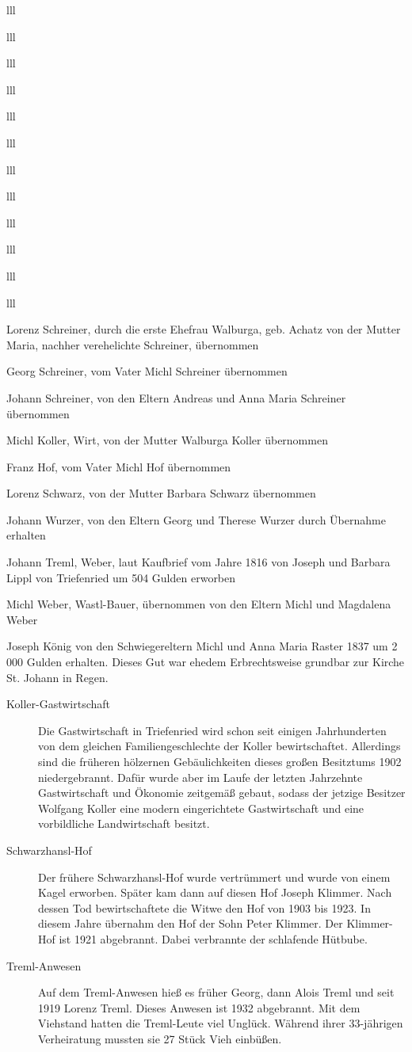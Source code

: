 \documentclass[12pt,a4pager]{book}
\begin{document}
\begin{tabuluar}{lll}
\begin{tabuluar}{lll}
\begin{tabuluar}{lll}
\begin{tabuluar}{lll}
\begin{tabuluar}{lll}
\begin{tabuluar}{lll}
\begin{tabuluar}{lll}
\begin{tabuluar}{lll}
\begin{tabuluar}{lll}
\begin{tabuluar}{lll}
\begin{tabuluar}{lll}
\begin{tabuluar}{lll}
\begin{compactitem}
\item Lorenz Schreiner, durch die erste Ehefrau Walburga, geb. Achatz von der
Mutter Maria, nachher verehelichte Schreiner, übernommen
\item Georg Schreiner, vom Vater Michl Schreiner übernommen
\item Johann Schreiner, von den Eltern Andreas und Anna Maria Schreiner
übernommen
\item Michl Koller, Wirt, von der Mutter Walburga Koller übernommen
\item Franz Hof, vom Vater Michl Hof übernommen
\item Lorenz Schwarz, von der Mutter Barbara Schwarz übernommen
\item Johann Wurzer, von den Eltern Georg und Therese Wurzer durch Übernahme
erhalten
\item Johann Treml, Weber, laut Kaufbrief vom Jahre 1816 von Joseph und Barbara
Lippl von Triefenried um 504 Gulden erworben
\item Michl Weber, Wastl-Bauer, übernommen von den Eltern Michl und Magdalena
Weber
\item Joseph König von den Schwiegereltern Michl und Anna Maria Raster 1837 um 2
000 Gulden erhalten. Dieses Gut war ehedem Erbrechtsweise grundbar zur Kirche
St. Johann in Regen.
\end{compactitem}

\begin{description}
\item[Koller-Gastwirtschaft] Die Gastwirtschaft in Triefenried wird schon seit
einigen Jahrhunderten von dem gleichen Familiengeschlechte der Koller
bewirtschaftet. Allerdings sind die früheren hölzernen Gebäulichkeiten dieses
großen Besitztums 1902 niedergebrannt. Dafür wurde aber im Laufe der letzten
Jahrzehnte Gastwirtschaft und Ökonomie zeitgemäß gebaut, sodass der jetzige
Besitzer Wolfgang Koller eine modern eingerichtete Gastwirtschaft und eine
vorbildliche Landwirtschaft besitzt.

\item[Schwarzhansl-Hof] Der frühere Schwarzhansl-Hof wurde vertrümmert und
wurde von einem Kagel erworben. Später kam dann auf diesen Hof Joseph Klimmer.
Nach dessen Tod bewirtschaftete die Witwe den Hof von 1903 bis 1923. In diesem
Jahre übernahm den Hof der Sohn Peter Klimmer. Der Klimmer-Hof ist 1921
abgebrannt. Dabei verbrannte der schlafende Hütbube.

\item[Treml-Anwesen] Auf dem Treml-Anwesen hieß es früher Georg, dann Alois
Treml und seit 1919 Lorenz Treml. Dieses Anwesen ist 1932 abgebrannt. Mit dem
Viehstand hatten die Treml-Leute viel Unglück. Während ihrer 33-jährigen
Verheiratung mussten sie 27 Stück Vieh einbüßen.


\end{description}
\end{tabuluar}
\end{tabuluar}
\end{tabuluar}
\end{tabuluar}
\end{tabuluar}
\end{tabuluar}
\end{tabuluar}
\end{tabuluar}
\end{tabuluar}
\end{tabuluar}
\end{tabuluar}
\end{tabuluar}
\end{document}
